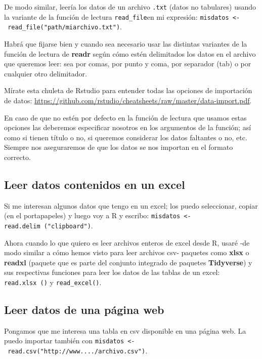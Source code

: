 \documentclass[]{book}
\theoremstyle{definition}
\theoremstyle{definition}
\theoremstyle{definition}
\theoremstyle{remark}
\begin{document}
De modo similar, leería los datos de un archivo \texttt{.txt} (datos no
tabulares) usando la variante de la función de lectura
\texttt{read\_file}en mi expresión:
\texttt{misdatos\ \textless{}-\ read\_file("path/miarchivo.txt")}.

Habrá que fijarse bien y cuando sea necesario usar las distintas
variantes de la función de lectura de \textbf{readr} según cómo estén
delimitados los datos en el archivo que queremos leer: sea por comas,
por punto y coma, por separador (tab) o por cualquier otro delimitador.

Mírate esta chuleta de Rstudio para entender todas las opciones de
importación de datos:
\url{https://github.com/rstudio/cheatsheets/raw/master/data-import.pdf}.

En caso de que no estén por defecto en la función de lectura que usamos
estas opciones las deberemos especificar nosotros en los argumentos de
la función; así como si tienen título o no, si queremos considerar los
datos faltantes o no, etc. Siempre nos aseguraremos de que los datos se
nos importan en el formato correcto.

\hypertarget{leer-datos-contenidos-en-un-excel}{%
\subsection{Leer datos contenidos en un
excel}\label{leer-datos-contenidos-en-un-excel}}

Si me interesan algunos datos que tengo en un excel; los puedo
seleccionar, copiar (en el portapapeles) y luego voy a R y escribo:
\texttt{misdatos\ \textless{}-read.delim\ ("clipboard")}.

Ahora cuando lo que quiero es leer archivos enteros de excel desde R,
usaré -de modo similar a cómo hemos visto para leer archivos csv-
paquetes como \textbf{xlsx} \citep{R-xlsx} o \textbf{readxl}
\citep{R-readxl} (paquete que es parte del conjunto integrado de
paquetes \textbf{Tidyverse}) y sus respectivas funciones para leer los
datos de las tablas de un excel: \texttt{read.xlsx\ ()} y
\texttt{read\_excel()}.

\hypertarget{leer-datos-de-una-pagina-web}{%
\subsection{Leer datos de una página
web}\label{leer-datos-de-una-pagina-web}}

Pongamos que me interesa una tabla en csv disponible en una página web.
La puedo importar también con
\texttt{misdatos\ \textless{}-\ read.csv("http://www..../archivo.csv")}.
\end{document}
